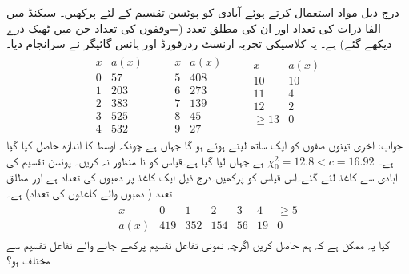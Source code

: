 \quad
درج ذیل مواد استعمال کرتے ہوئے آبادی کو پوئسن تقسیم کے لئے پرکھیں۔ سیکنڈ میں الفا ذرات کی تعداد  اور  ان کی مطلق تعدد (=وقفوں کی تعداد جن میں ٹھیک  ذرے دیکھے گئے) ہے۔ یہ کلاسیکی تجربہ ارنسٹ ردرفورڈ اور ہانس گائیگر نے  سرانجام دیا۔
\begin{align*}
\begin{array}{rr}
x&a(x)\\
\hline
0&57\\
1&203\\
2&383\\
3&525\\
4&532
\end{array}\quad\quad
\begin{array}{rr}
x&a(x)\\
\hline
5&408\\
6&273\\
7&139\\
8&45\\
9&27
\end{array}\quad\quad
\begin{array}{rr}
x&a(x)\\
\hline
10&10\\
11&4\\
12&2\\
\ge 13&0\\
&
\end{array}
\end{align*}
جواب:\quad
آخری تینوں صفوں کو ایک ساتھ لیتے ہوئے  ہو گا جہاں  ہے چونکہ اوسط کا اندازہ حاصل کیا گیا ہے۔
$\chi^2_0=12.8<c=16.92$
ہے جہاں  لیا گیا ہے۔قیاس کو نا منظور نہ کریں۔ 
\quad
پوئسن تقسیم کی  آبادی سے  کاغذ لئے گئے۔اس قیاس کو پرکھیں۔درج ذیل ایک کاغذ پر دھبوں کی تعداد  ہے اور   مطلق تعدد ( دھبوں والے کاغذوں کی تعداد) ہے۔  
\begin{align*}
\begin{array}{ccccccc}
x&0&1&2&3&4&\ge 5\\
a(x)&419&352&154&56&19&0
\end{array}
\end{align*}
\quad
کیا یہ ممکن ہے کہ ہم  حاصل کریں اگرچہ  نمونی تفاعل تقسیم پرکھے جانے والے  تفاعل تقسیم  سے مختلف ہو؟


